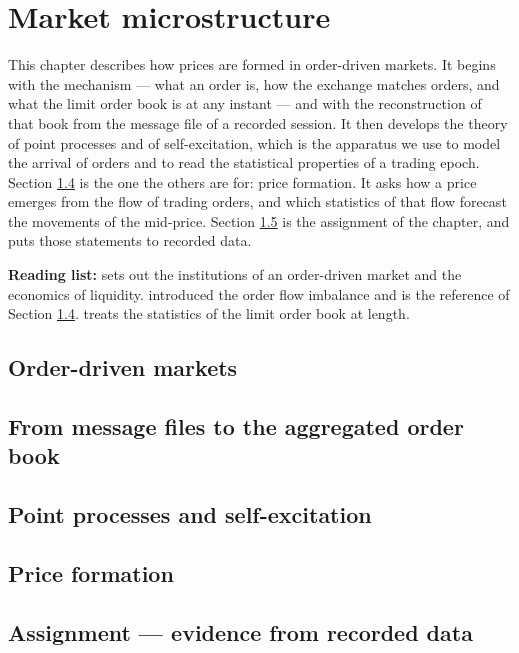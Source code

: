 \chapter{Market microstructure}
\label{chap.microstructure}

This chapter describes how prices are formed in order-driven markets.
It begins with the mechanism --- what an order is, how the exchange matches orders,
and what the limit order book is at any instant ---
and with the reconstruction of that book from the message file of a recorded session.
It then develops the theory of point processes and of self-excitation,
which is the apparatus we use to model the arrival of orders
and to read the statistical properties of a trading epoch.
Section \ref{sec.priceFormation} is the one the others are for:
price formation.
It asks how a price emerges from the flow of trading orders,
and which statistics of that flow forecast the movements of the mid-price.
Section \ref{sec.lobsterEmpirics} is the assignment of the chapter,
and puts those statements to recorded data.

\textbf{Reading list:}
\citet[Chapters 1--3]{FPR13mar} sets out the institutions of an order-driven market
and the economics of liquidity.
\cite{CKS14pri} introduced the order flow imbalance
and is the reference of Section \ref{sec.priceFormation}.
\cite{Bou18tra} treats the statistics of the limit order book at length.

\section{Order-driven markets}
\label{sec.orderDrivenMarkets}


\section{From message files to the aggregated order book}
\label{sec.messageFiles}


\section{Point processes and self-excitation}
\label{sec.pointProcesses}


\section{Price formation}
\label{sec.priceFormation}


\section{Assignment --- evidence from recorded data}
\label{sec.lobsterEmpirics}

